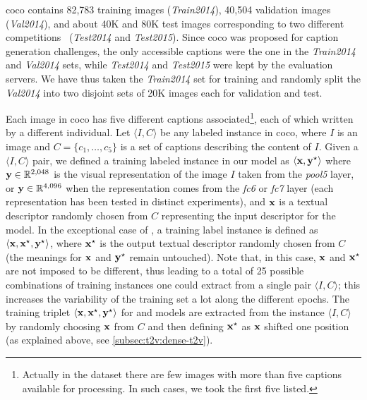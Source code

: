 \sloppy \gls{coco} contains 82,783 training images (\emph{Train2014}), 40,504 validation images (\emph{Val2014}), and about 40K and 80K test images corresponding to two different competitions~\cite{chen2015microsoft} (\emph{Test2014} and \emph{Test2015}).
Since \gls{coco} was proposed for caption generation challenges, the only accessible captions were the one in the \emph{Train2014} and \emph{Val2014} sets, while \emph{Test2014} and \emph{Test2015} were kept by the evaluation servers.
We have thus taken the \emph{Train2014} set for training and randomly split the \emph{Val2014} into two disjoint sets of 20K images each for validation and test.

Each image in \gls{coco} has five different captions associated\footnote{Actually in the dataset there are few images with more than five captions available for processing. In such cases, we took the first five listed.}, each of which written by a different individual.
Let $\langle I, C \rangle$ be any labeled instance in \gls{coco}, where $I$ is an image and $C = \{ c_1, \ldots, c_5\}$ is a set of captions describing the content of $I$.
Given a $\langle I, C \rangle$ pair, we defined a training labeled instance in our model as $\left \langle \mathbf{x},\mathbf{y}^\star \right \rangle$ where $\mathbf{y} \in \mathbb{R}^{2,048}$ is the visual representation of the image $I$ taken from the \emph{pool5} layer, or $\mathbf{y} \in \mathbb{R}^{4,096}$ when the representation comes from the \emph{fc6} or \emph{fc7} layer (each representation has been tested in distinct experiments), and $\mathbf{x}$ is a textual descriptor randomly chosen from $C$ representing the input descriptor for the model.
In the exceptional case of \sparsettv{}, a training label instance is defined as $\left \langle \mathbf{x}, \mathbf{x}^\star, \mathbf{y}^\star \right \rangle$, where $\mathbf{x}^\star$ is the output textual descriptor randomly chosen from $C$ (the meanings for $\mathbf{x}$ and $\mathbf{y}^\star$ remain untouched).
Note that, in this case, $\mathbf{x}$ and $\mathbf{x}^\star$ are not imposed to be different, thus leading to a total of 25 possible combinations of training instances one could extract from a single pair $\langle I, C \rangle$;
this increases the variability of the training set a lot along the different epochs.
The training triplet $\langle \mathbf{x}, \mathbf{x}^\star, \mathbf{y}^\star \rangle$ for \densettv{} and \widedeepttv{} models are extracted from the instance $\langle I, C \rangle$ by randomly choosing $\mathbf{x}$ from $C$ and then defining $\mathbf{x}^\star$ as $\mathbf{x}$ shifted one position (as explained above, see \ref{subsec:t2v:dense-t2v}).


